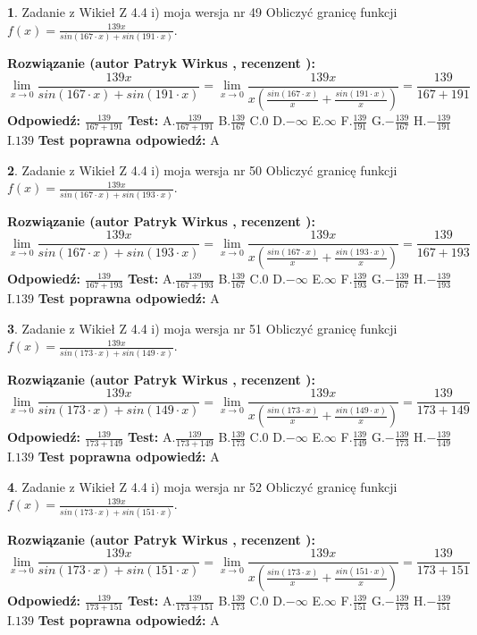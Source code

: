 \documentclass[12pt, a4paper]{article}
\theoremstyle{definition} %
\newtheorem{zad}{}
\newcommand{\zadStart}[1]{\begin{zad}#1\newline}
\newcommand{\zadStop}{\end{zad}}
\newcommand{\rozwStart}[2]{\noindent \textbf{Rozwiązanie (autor #1 , recenzent #2): }\newline}
\newcommand{\rozwStop}{\newline}
\newcommand{\odpStart}{\noindent \textbf{Odpowiedź:}\newline}
\newcommand{\odpStop}{\newline}
\newcommand{\testStart}{\noindent \textbf{Test:}\newline}
\newcommand{\testStop}{\newline}
\newcommand{\kluczStart}{\noindent \textbf{Test poprawna odpowiedź:}\newline}
\newcommand{\kluczStop}{\newline}
\begin{document}
\zadStart{Zadanie z Wikieł Z 4.4 i) moja wersja nr 49}
Obliczyć granicę funkcji $f(x)=\frac{139x}{sin(167\cdot x) +sin(191\cdot x)}$.
\zadStop
\rozwStart{Patryk Wirkus}{}
$$\lim\limits_{x\to 0}\frac{139x}{sin(167\cdot x) +sin(191\cdot x)}=\lim\limits_{x\to 0}\frac{139x}{x(\frac{sin(167\cdot x)}{x}+\frac{sin(191\cdot x)}{x})}=\frac{139}{167+191}$$
\rozwStop
\odpStart
$\frac{139}{167+191}$
\odpStop
\testStart
A.$\frac{139}{167+191}$
B.$\frac{139}{167}$
C.$0$
D.$-\infty$
E.$\infty$
F.$\frac{139}{191}$
G.$-\frac{139}{167}$
H.$-\frac{139}{191}$
I.$139$
\testStop
\kluczStart
A
\kluczStop



\zadStart{Zadanie z Wikieł Z 4.4 i) moja wersja nr 50}
Obliczyć granicę funkcji $f(x)=\frac{139x}{sin(167\cdot x) +sin(193\cdot x)}$.
\zadStop
\rozwStart{Patryk Wirkus}{}
$$\lim\limits_{x\to 0}\frac{139x}{sin(167\cdot x) +sin(193\cdot x)}=\lim\limits_{x\to 0}\frac{139x}{x(\frac{sin(167\cdot x)}{x}+\frac{sin(193\cdot x)}{x})}=\frac{139}{167+193}$$
\rozwStop
\odpStart
$\frac{139}{167+193}$
\odpStop
\testStart
A.$\frac{139}{167+193}$
B.$\frac{139}{167}$
C.$0$
D.$-\infty$
E.$\infty$
F.$\frac{139}{193}$
G.$-\frac{139}{167}$
H.$-\frac{139}{193}$
I.$139$
\testStop
\kluczStart
A
\kluczStop



\zadStart{Zadanie z Wikieł Z 4.4 i) moja wersja nr 51}
Obliczyć granicę funkcji $f(x)=\frac{139x}{sin(173\cdot x) +sin(149\cdot x)}$.
\zadStop
\rozwStart{Patryk Wirkus}{}
$$\lim\limits_{x\to 0}\frac{139x}{sin(173\cdot x) +sin(149\cdot x)}=\lim\limits_{x\to 0}\frac{139x}{x(\frac{sin(173\cdot x)}{x}+\frac{sin(149\cdot x)}{x})}=\frac{139}{173+149}$$
\rozwStop
\odpStart
$\frac{139}{173+149}$
\odpStop
\testStart
A.$\frac{139}{173+149}$
B.$\frac{139}{173}$
C.$0$
D.$-\infty$
E.$\infty$
F.$\frac{139}{149}$
G.$-\frac{139}{173}$
H.$-\frac{139}{149}$
I.$139$
\testStop
\kluczStart
A
\kluczStop



\zadStart{Zadanie z Wikieł Z 4.4 i) moja wersja nr 52}
Obliczyć granicę funkcji $f(x)=\frac{139x}{sin(173\cdot x) +sin(151\cdot x)}$.
\zadStop
\rozwStart{Patryk Wirkus}{}
$$\lim\limits_{x\to 0}\frac{139x}{sin(173\cdot x) +sin(151\cdot x)}=\lim\limits_{x\to 0}\frac{139x}{x(\frac{sin(173\cdot x)}{x}+\frac{sin(151\cdot x)}{x})}=\frac{139}{173+151}$$
\rozwStop
\odpStart
$\frac{139}{173+151}$
\odpStop
\testStart
A.$\frac{139}{173+151}$
B.$\frac{139}{173}$
C.$0$
D.$-\infty$
E.$\infty$
F.$\frac{139}{151}$
G.$-\frac{139}{173}$
H.$-\frac{139}{151}$
I.$139$
\testStop
\kluczStart
A
\kluczStop
\end{document}
